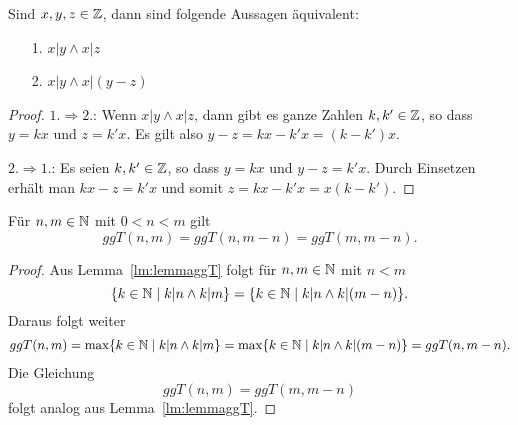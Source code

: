 \begin{lm}\label{lm:lemmaggT}
 Sind $x,y,z\in\mathbb{Z}$, dann sind folgende Aussagen äquivalent:
\begin{enumerate}
\item[1.] $ x|y\wedge x|z$
\item[2.] $x|y\wedge x|(y-z) $
\end{enumerate}
\end{lm}
\begin{proof}
 $1.\Rightarrow 2.$: Wenn $x|y\wedge x|z$, dann gibt es ganze Zahlen $k,k'\in\mathbb{Z}$, so dass $y=kx$ und $z=k'x$. Es gilt also $y-z=kx-k'x=(k-k')x$.

$2.\Rightarrow 1.$: Es seien $k,k'\in\mathbb{Z}$, so dass $y=kx$ und $y-z=k'x$. Durch Einsetzen erhält man $ kx-z=k'x $ und somit $z=kx-k'x=x(k-k')$.
\end{proof}

\begin{satz}\label{satz:euklid}
 Für $n,m\in\mathbb{N}$ mit $0<n< m$ gilt
\[
 ggT(n,m)=ggT(n,m-n)=ggT(m,m-n).
\]
\end{satz}
\begin{proof}
Aus Lemma~\ref{lm:lemmaggT} folgt für $n,m\in\mathbb{N}$ mit $n<m$
\[
\{k\in\mathbb{N}\mid k|n\wedge k|m\}=\{k\in\mathbb{N}\mid k|n\wedge k|(m-n)\}.
\]
Daraus folgt weiter
\begin{align*}
ggT(n,m)=\max\{k\in\mathbb{N}\mid k|n\wedge k|m\}=\max\{k\in\mathbb{N}\mid k|n\wedge k|(m-n)\}=ggT(n,m-n).
\end{align*}
Die Gleichung
\[
 ggT(n,m)=ggT(m,m-n)
\]
folgt analog aus Lemma~\ref{lm:lemmaggT}.
\end{proof}

